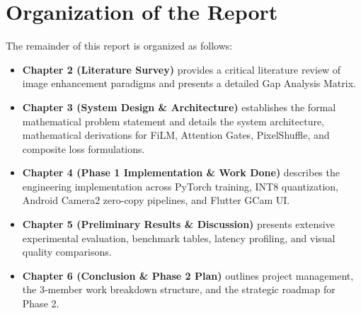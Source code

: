 \section{Organization of the Report}
The remainder of this report is organized as follows:
\begin{itemize}
    \item \textbf{Chapter 2 (Literature Survey)} provides a critical literature review of image enhancement paradigms and presents a detailed Gap Analysis Matrix.
    \item \textbf{Chapter 3 (System Design \& Architecture)} establishes the formal mathematical problem statement and details the system architecture, mathematical derivations for FiLM, Attention Gates, PixelShuffle, and composite loss formulations.
    \item \textbf{Chapter 4 (Phase 1 Implementation \& Work Done)} describes the engineering implementation across PyTorch training, INT8 quantization, Android Camera2 zero-copy pipelines, and Flutter GCam UI.
    \item \textbf{Chapter 5 (Preliminary Results \& Discussion)} presents extensive experimental evaluation, benchmark tables, latency profiling, and visual quality comparisons.
    \item \textbf{Chapter 6 (Conclusion \& Phase 2 Plan)} outlines project management, the 3-member work breakdown structure, and the strategic roadmap for Phase 2.
\end{itemize}
